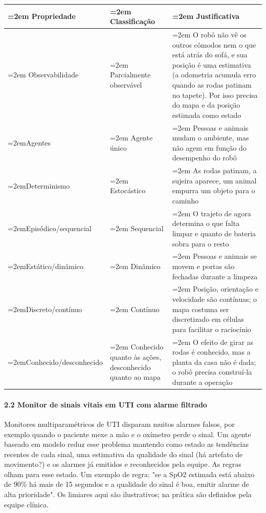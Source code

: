 \documentclass[12pt, a4paper]{article}
\begin{document}
\begingroup
\setlength{\tabcolsep}{4.0pt}
\begin{longtable}{@{}>{\raggedright\hyphenpenalty=30\tolerance=999\emergencystretch=2em\arraybackslash}p{4.50cm}>{\raggedright\hyphenpenalty=30\tolerance=999\emergencystretch=2em\arraybackslash}p{2.94cm}>{\raggedright\hyphenpenalty=30\tolerance=999\emergencystretch=2em\arraybackslash}p{7.28cm}@{}}
\toprule\noalign{}
Propriedade & Clas\-si\-fi\-ca\-ção & Justificativa \\
\midrule\noalign{}
\endhead
\bottomrule\noalign{}
\endlastfoot
Observabilidade & Parcialmente ob\-ser\-vá\-vel & O robô não vê os outros cômodos nem o que está atrás do sofá, e sua posição é uma estimativa (a odometria acumula erro quando as rodas patinam no tapete\allowbreak ). Por isso precisa do mapa e da posição estimada como estado \\
Agentes & Agente único & Pessoas e animais mudam o ambiente, mas não agem em função do desempenho do robô \\
Determinismo & Es\-to\-cás\-tico & As rodas patinam, a sujeira aparece, um animal empurra um objeto para o caminho \\
Episódico\slash sequencial & Sequencial & O trajeto de agora determina o que falta limpar e quanto de bateria sobra para o resto \\
Estático\slash dinâmico & Dinâmico & Pessoas e animais se movem e portas são fechadas durante a limpeza \\
Discreto\slash contínuo & Contínuo & Posição, ori\-en\-ta\-ção e velocidade são contínuas; o mapa costuma ser discretizado em células para facilitar o ra\-ci\-o\-cí\-nio \\
Conhecido\slash desconhecido & Conhecido quanto às ações, desconhecido quanto ao mapa & O efeito de girar as rodas é conhecido, mas a planta da casa não é dada; o robô precisa construí-la durante a operação \\
\end{longtable}
\endgroup

\paragraph{2.2 Monitor de sinais vitais em UTI com alarme filtrado}\label{22-monitor-de-sinais-vitais-em-uti-com-alarme-filtrado}

Monitores multiparamétricos de UTI disparam muitos alarmes falsos, por exemplo quando o paciente mexe a mão e o oxímetro perde o sinal. Um agente baseado em modelo reduz esse problema mantendo como estado as tendências recentes de cada sinal, uma estimativa da qualidade do sinal (há artefato de movimento?) e os alarmes já emitidos e reconhecidos pela equipe. As regras olham para esse estado. Um exemplo de regra: "se a SpO2 estimada está abaixo de 90\% há mais de 15 segundos e a qualidade do sinal é boa, emitir alarme de alta prioridade". Os limiares aqui são ilustrativos; na prática são definidos pela equipe clínica.
\end{document}
